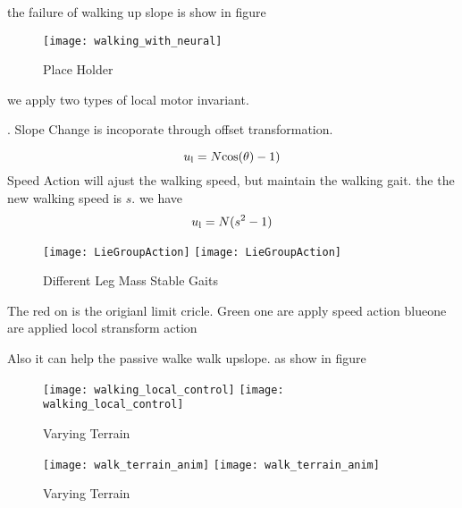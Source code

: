 the failure of walking up slope is show in figure

\begin{figure}[!htbp]
  \begin{center}
      \texttt{[image: walking\_with\_neural]}
    \caption{Place Holder}
    \label{fig:withoutlocalcontroller}
\end{center}
\end{figure}

we apply two types of local motor invariant.
\begin{itemize}

.
Slope Change is incoporate through offset transformation.

\[
u_{\mathrm{l}}=N\mathrm{cos}(\theta)-1)
\]
Speed Action will ajust the walking speed, but maintain the walking gait.
the the new walking speed is $s$.
we have
\[  
u_{\mathrm{l}}=N(s^2-1)
\]
\end{itemize}

\begin{figure}[!htbp]
  \begin{center}
    \leavevmode
    \ifpdf
      \texttt{[image: LieGroupAction]}
    \else
      \texttt{[image: LieGroupAction]}
    \fi
    \caption{Different Leg Mass Stable Gaits}
    \label{fig:differentlr}
\end{center}
\end{figure}

The red on is the origianl limit cricle.
Green one are apply speed action
blueone are applied  locol stransform action

Also it can help the passive walke walk upslope.
as show in figure


\begin{figure}[!htbp]
  \begin{center}
    \leavevmode
    \ifpdf
      \texttt{[image: walking\_local\_control]}
    \else
      \texttt{[image: walking\_local\_control]}
    \fi
    \caption{Varying Terrain}
    \label{fig:diffterrain}
\end{center}
\end{figure}




\begin{figure}[!htbp]
  \begin{center}
    \leavevmode
    \ifpdf
      \texttt{[image: walk\_terrain\_anim]}
    \else
      \texttt{[image: walk\_terrain\_anim]}
    \fi
    \caption{Varying Terrain}
    \label{fig:diffterrain}
\end{center}
\end{figure}



